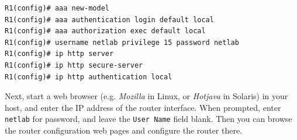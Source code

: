\documentclass{../UTNetLab}
\begin{document}
    \begin{lstlisting}[language={cisco}]
R1(config)# aaa new-model
R1(config)# aaa authentication login default local
R1(config)# aaa authorization exec default local
R1(config)# username netlab privilege 15 password netlab
R1(config)# ip http server
R1(config)# ip http secure-server
R1(config)# ip http authentication local
    \end{lstlisting}
    
    Next, start a web browser (e.g. \textit{Mozilla} in Linux, or \textit{Hotjava} in Solaris) in your host, and enter the IP address of the router interface. When prompted, enter \texttt{netlab} for password, and leave the \texttt{User Name} field blank. Then you can browse the router configuration web pages and configure the router there.
\end{document}

